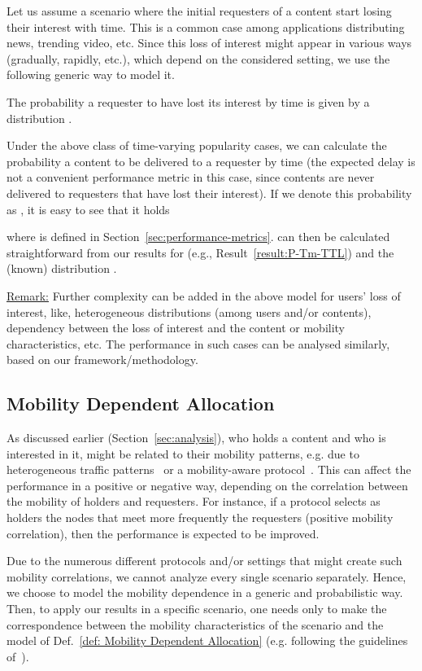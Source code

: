 \documentclass[journal]{IEEEtran}
\newcommand{\revisionRed}[1]{{#1}}\newcommand{\red}[1]{{#1}}
\begin{document}
\revisionRed{Let us assume a scenario where the initial requesters of a content start losing their interest with time. This is a common case among applications distributing news, trending video, etc. Since this loss of interest might appear in various ways (gradually, rapidly, etc.), which depend on the considered setting, we use the following generic way to model it.
\begin{definition}[Time-varying Popularity]
The probability a requester to have lost its interest by time  is given by a distribution .
\end{definition}
Under the above class of time-varying popularity cases, we can calculate the probability a content to be delivered to a requester by time  (the expected delay is not a convenient performance metric in this case, since contents are never delivered to requesters that have lost their interest). If we denote this probability as , it is easy to see that it holds

where  is defined in Section~\ref{sec:performance-metrics}.  can then be calculated straightforward from our results for  (e.g., Result~\ref{result:P-Tm-TTL}) and the (known) distribution .}

\revisionRed{\underline{Remark:} Further complexity can be added in the above model for users' loss of interest, like, heterogeneous distributions  (among users and/or contents), dependency between the loss of interest and the content or mobility characteristics, etc. The performance in such cases can be analysed similarly, based on our framework/methodology. }




\subsection*{\textbf{Mobility Dependent Allocation}}

\red{As discussed earlier (Section~\ref{sec:analysis}), who holds a content and who is interested in it, might be related to their mobility patterns, e.g. due to heterogeneous traffic patterns~\cite{pavlos-TMC-traffic} or a mobility-aware protocol~\cite{contentplace, multiple-offloading}. This can affect the performance in a positive or negative way, depending on the correlation between the mobility of holders and requesters. For instance, if a protocol selects as holders the nodes that meet more frequently the requesters (positive mobility correlation), then the performance is expected to be improved.}

\red{Due to the numerous different protocols and/or settings that might create such mobility correlations, we cannot analyze every single scenario separately. Hence, we choose to model the mobility dependence in a generic and probabilistic way. Then, to apply our results in a specific scenario, one needs only to make the correspondence between the mobility characteristics of the scenario and the model of Def.~\ref{def: Mobility Dependent Allocation} (e.g. following the guidelines of~\cite{pavlos-TMC-traffic}).}
\end{document}
